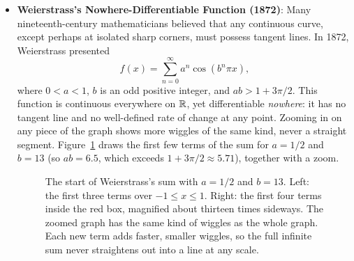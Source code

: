 \begin{itemize}
  \item \textbf{Weierstrass's Nowhere-Differentiable Function (1872)}: Many nineteenth-century mathematicians believed that any continuous curve, except perhaps at isolated sharp corners, must possess tangent lines. In 1872, Weierstrass presented
  \[
  f(x) = \sum_{n=0}^\infty a^n \cos(b^n \pi x),
  \]
  where $0 < a < 1$, $b$ is an odd positive integer, and $ab > 1 + 3\pi/2$. This function is continuous everywhere on $\mathbb{R}$, yet differentiable \emph{nowhere}: it has no tangent line and no well-defined rate of change at any point. Zooming in on any piece of the graph shows more wiggles of the same kind, never a straight segment. Figure~\ref{35:fig-weierstrass} draws the first few terms of the sum for $a = 1/2$ and $b = 13$ (so $ab = 6.5$, which exceeds $1 + 3\pi/2 \approx 5.71$), together with a zoom.

  \begin{figure}[htbp]
  \centering
  \caption{The start of Weierstrass's sum with $a = 1/2$ and $b = 13$. Left: the first three terms over $-1 \le x \le 1$. Right: the first four terms inside the red box, magnified about thirteen times sideways. The zoomed graph has the same kind of wiggles as the whole graph. Each new term adds faster, smaller wiggles, so the full infinite sum never straightens out into a line at any scale.}
  \label{35:fig-weierstrass}
  \end{figure}


\end{itemize}
